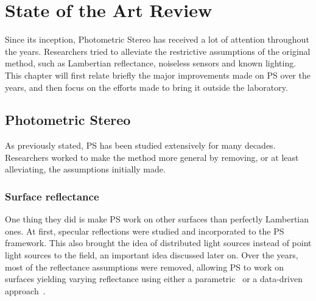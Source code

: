 
\chapter{State of the Art Review}
\label{c:sota}


Since its inception, Photometric Stereo has received a lot of attention throughout the years. Researchers tried to alleviate the restrictive assumptions of the original method, such as Lambertian reflectance, noiseless sensors and known lighting. This chapter will first relate briefly the major improvements made on PS over the years, and then focus on the efforts made to bring it outside the laboratory.


\section{Photometric Stereo}

As previously stated, PS has been studied extensively for many decades. Researchers worked to make the method more general by removing, or at least alleviating, the assumptions initially made.

\subsection{Surface reflectance}
One thing they did is make PS work on other surfaces than perfectly Lambertian ones. At first, specular reflections \cite{Ikeuchi1981} were studied and incorporated to the PS framework. This also brought the idea of distributed light sources instead of point light sources to the field, an important idea discussed later on. Over the years, most of the reflectance assumptions were removed, allowing PS to work on surfaces yielding varying reflectance using either a parametric~\cite{hertzmann-pami-05,goldman-tpami-10} or a data-driven approach~\cite{alldrin-cvpr-08}.


